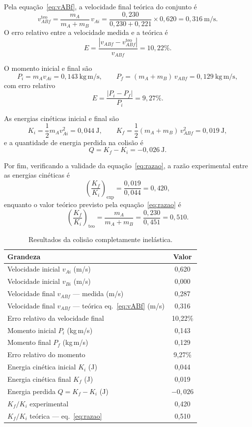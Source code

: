 \documentclass[12pt,a4paper]{article}
\begin{document}
Pela equação~\eqref{eq:vABf}, a velocidade final teórica do conjunto é
\[
v_{ABf}^{\text{teo}} = \frac{m_A}{m_A + m_B}\, v_{Ai}
       = \frac{0{,}230}{0{,}230 + 0{,}221}\times 0{,}620 = 0{,}316~\mathrm{m/s}.
\]
O erro relativo entre a velocidade medida e a teórica é
\[
E = \frac{\left|v_{ABf} - v_{ABf}^{\text{teo}}\right|}{v_{ABf}} = 10{,}22\%.
\]

O momento inicial e final são
\[
P_i = m_A v_{Ai} = 0{,}143~\mathrm{kg\,m/s}, \qquad
P_f = (m_A + m_B)\, v_{ABf} = 0{,}129~\mathrm{kg\,m/s},
\]
com erro relativo
\[
E = \frac{|P_i - P_f|}{P_i} = 9{,}27\%.
\]

As energias cinéticas inicial e final são
\[
K_i = \frac{1}{2}m_A v_{Ai}^2 = 0{,}044~\mathrm{J}, \qquad
K_f = \frac{1}{2}(m_A + m_B)\, v_{ABf}^2 = 0{,}019~\mathrm{J},
\]
e a quantidade de energia perdida na colisão é
\[
Q = K_f - K_i = -0{,}026~\mathrm{J}.
\]

Por fim, verificando a validade da equação~\eqref{eq:razao}, a razão experimental entre as
energias cinéticas é
\[
\left(\frac{K_f}{K_i}\right)_{\text{exp}} = \frac{0{,}019}{0{,}044} = 0{,}420,
\]
enquanto o valor teórico previsto pela equação~\eqref{eq:razao} é
\[
\left(\frac{K_f}{K_i}\right)_{\text{teo}} = \frac{m_A}{m_A + m_B}
       = \frac{0{,}230}{0{,}451} = 0{,}510.
\]

\begin{table}[!h]
	\centering
	\begin{tabular}{|l|c|} \hline \hline
	Grandeza & Valor \\ \hline \hline
	Velocidade inicial $v_{Ai}$ (m/s)                     & 0,620 \\ \hline
	Velocidade inicial $v_{Bi}$ (m/s)                     & 0,000 \\ \hline
	Velocidade final $v_{ABf}$ --- medida (m/s)           & 0,287 \\ \hline
	Velocidade final $v_{ABf}$ --- teórica eq.~\eqref{eq:vABf} (m/s) & 0,316 \\ \hline
	Erro relativo da velocidade final                     & 10,22\% \\ \hline
	Momento inicial $P_i$ (kg\,m/s)                       & 0,143 \\ \hline
	Momento final $P_f$ (kg\,m/s)                         & 0,129 \\ \hline
	Erro relativo do momento                              & 9,27\% \\ \hline
	Energia cinética inicial $K_i$ (J)                    & 0,044 \\ \hline
	Energia cinética final $K_f$ (J)                      & 0,019 \\ \hline
	Energia perdida $Q = K_f - K_i$ (J)                   & $-0{,}026$ \\ \hline
	$K_f/K_i$ experimental                                & 0,420 \\ \hline
	$K_f/K_i$ teórica --- eq.~\eqref{eq:razao}            & 0,510 \\ \hline \hline
	\end{tabular}
	\caption{Resultados da colisão completamente inelástica.}
	\label{tab:result-in}
\end{table}
\end{document}
